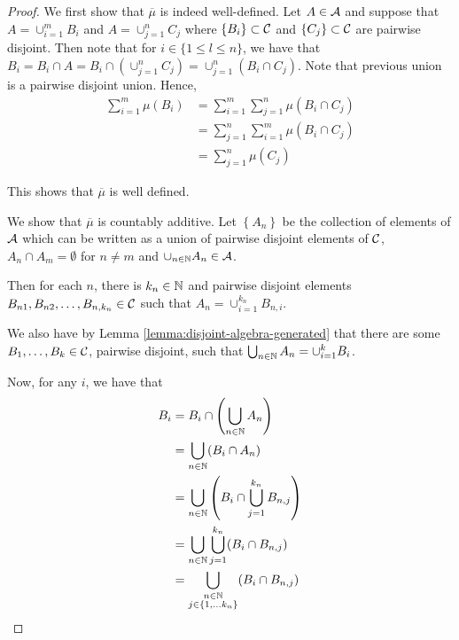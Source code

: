 \begin{proof}
    We first show that $\overline \mu$ is indeed well-defined. Let $A\in {\cal A}$ and suppose that $A= \cup_{i=1}^{m} B_i$ and $A=\cup_{j=1}^{n} C_j$ where  $\left\{ B_i \right\} \subset {\cal C}$ and $\left\{ C_j \right\} \subset {\cal C}$ are pairwise disjoint. Then note that for $i \in \{1\le l \le n\}$, we have that $B_i = B_i \cap A = B_i \cap \left(\cup_{j=1}^{n} C_j\right) = \cup_{j=1}^{n} (B_i \cap C_j)$. Note that previous union is a pairwise disjoint union. Hence,
    \begin{align*}
	\sum_{i=1}^{m} \mu (B_i ) &= \sum_{i=1}^{m} \sum_{j=1}^{n} \mu(B_i \cap C_j) \\
	&= \sum_{j=1}^{n} \sum_{i=1}^{m} \mu(B_i \cap C_j) \\
	&= \sum_{j=1}^{n} \mu (C_j)
    \end{align*}

    This shows that $\overline \mu$ is well defined.

    We show that $\overline \mu $ is countably additive. Let $\left\{ A_n \right\}$ be the collection of elements of ${\cal A}$ which can be written as a union of pairwise disjoint elements of ${\cal C}$, $A_n \cap A_m = \emptyset$ for $n\ne m$ and $\cup_{n\in \mathbb N} A_n \in {\cal A}$.

    Then for each $n$, there is $k_n \in \mathbb N$ and pairwise disjoint elements $B_{n1} , B_{n2} , \ldots , B_{n,k_n} \in {\cal C}$ such that $A_n = \cup_{i=1}^{k_n} B_{n,i}$.

    We also have by Lemma \ref{lemma:disjoint-algebra-generated} that there are some $B_1 , \ldots , B_k \in{\cal C}$, pairwise disjoint, such that $\bigcup_{n\in \mathbb N} A_n = \cup_{i=1}^{k} B_i$. 

    Now, for any $i$, we have that 
    \begin{align*}
	B_i &= B_i \cap \left( \bigcup_{n\in\mathbb N} A_n \right) \\
	&= \bigcup_{n\in \mathbb N} (B_i \cap A_n) \\
	&= \bigcup_{n\in \mathbb N} \left( B_i \cap \bigcup_{j=1}^{k_n} B_{n,j} \right) \\
	&= \bigcup_{n\in \mathbb N} \bigcup_{j=1}^{k_n} (B_i \cap B_{n,j}) \\
	&= \bigcup_{\substack{n\in \mathbb N \\ j\in \left\{ 1, \ldots k_n \right\}}} (B_i \cap B_{n,j}) 
    \end{align*}


\end{proof}

